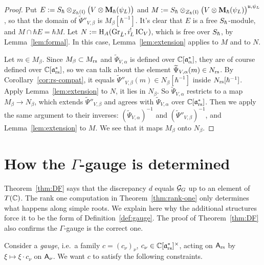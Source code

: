 \documentclass{article}
\theoremstyle{plain}
\theoremstyle{definition}
\theoremstyle{remark}
\numberwithin{equation}{section}
\begin{document}
\begin{proof}
Put $E:=S_\hbar\otimes_{Z_\hbar(\mathfrak{l})}\bigl(V\otimes\mathbf{M}_\hbar(\psi_L)\bigr)$ and $M:=S_\hbar\otimes_{Z_\hbar(\mathfrak{l})}\bigl(V\otimes\mathbf{M}_\hbar(\psi_L)\bigr)^{\mathfrak{u},\psi_L}$, so that the domain of $\widetilde\Psi''_{V,\beta}$ is $M_\beta[\hbar^{-1}]$. It's clear that $E$ is a free $S_\hbar$-module, and $M\cap\hbar E=\hbar M$. Let $N:=\mathrm{H}_A(\operatorname{Gr}_{\check{L}},i_L^!\operatorname{IC}_V)$, which is free over $S_\hbar$, by Lemma~\ref{lem:formal}. In this case, Lemma~\ref{lem:extension} applies to $M$ and to $N$.

Let $m\in M_\beta$. Since $M_\beta\subset M_{\mathrm{rs}}$ and $\widetilde\Psi_{V,\alpha}$ is defined over $\mathbb{C}[\mathfrak{a}^*_{\alpha}]$, they are of course defined over $\mathbb{C}[\mathfrak{a}^*_{\mathrm{rs}}]$, so we can talk about the element $\widetilde\Psi_{V,\alpha}(m)\in N_{\mathrm{rs}}$. By Corollary~\ref{cor:rs-compat}, it equals $\widetilde\Psi''_{V,\beta}(m)\in N_\beta[\hbar^{-1}]$ inside $N_{\mathrm{rs}}[\hbar^{-1}]$. Apply Lemma~\ref{lem:extension} to $N$, it lies in $N_\beta$. So $\widetilde\Psi_{V,\alpha}$ restricts to a map $M_\beta\to N_\beta$, which extends $\widetilde\Psi''_{V,\beta}$ and agrees with $\widetilde\Psi_{V,\alpha}$ over $\mathbb{C}[\mathfrak{a}^*_{\mathrm{rs}}]$. Then we apply the same argument to their inverses: $(\widetilde\Psi_{V,\alpha})^{-1}$ and $(\widetilde\Psi''_{V,\beta})^{-1}$, and Lemma~\ref{lem:extension} to $M$. We see that it maps $M_\beta$ onto $N_\beta$.
\end{proof}

\section{How the \texorpdfstring{$\Gamma$}{Gamma}-gauge is determined}\label{sec:gauge-why}
Theorem~\ref{thm:DF} says that the discrepancy $d$ equals $\mathcal G_G$ up to an element of $T(\mathbb{C})$. The rank one computation in Theorem~\ref{thm:rank-one} only determines what happens along simple roots. We explain here why the additional structures force it to be the form of Definition~\ref{def:gauge}. The proof of Theorem~\ref{thm:DF} also confirms the $\Gamma$-gauge is the correct one.

Consider a \emph{gauge}, i.e.\ a family $c=(c_\nu)_\nu$, $c_\nu\in\mathbb{C}[\mathfrak{a}^*_{\mathrm{rs}}]^\times$, acting on $\mathsf A_{\mathrm{rs}}$ by $\xi\mapsto\xi\cdot c_\nu$ on $\mathsf A_\nu$. We want $c$ to satisfy the following constraints.
\end{document}
